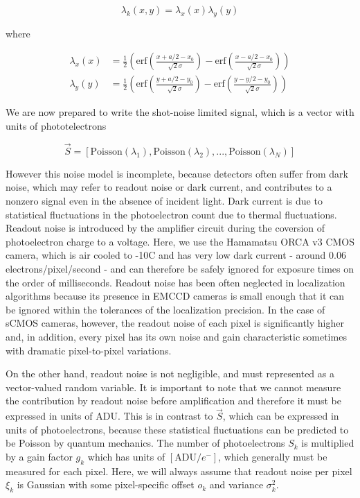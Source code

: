 \documentclass{ucetd}
\begin{document}
\begin{equation}
\lambda_{k}(x,y) = \lambda_{x}(x)\lambda_{y}(y)
\end{equation}

where

\begin{align*}
\lambda_{x}(x) &= \frac{1}{2}\left(\mathrm{erf}\left(\frac{x+a/2-x_{0}}{\sqrt{2}\sigma}\right) -\mathrm{erf}\left(\frac{x-a/2-x_{0}}{\sqrt{2}\sigma}\right)\right)\\
\lambda_{y}(y) &= \frac{1}{2}\left(\mathrm{erf}\left(\frac{y+a/2-y_{0}}{\sqrt{2}\sigma}\right) -\mathrm{erf}\left(\frac{y-y/2-y_{0}}{\sqrt{2}\sigma}\right)\right)
\end{align*}

We are now prepared to write the shot-noise limited signal, which is a vector with units of phototelectrons

\begin{equation}
\vec{S} = \left[\mathrm{Poisson}(\lambda_{1}), \mathrm{Poisson}(\lambda_{2}), ..., \mathrm{Poisson}(\lambda_{N})\right]
\end{equation}


However this noise model is incomplete, because detectors often suffer from dark noise, which may refer to readout noise or dark current, and contributes to a nonzero signal even in the absence of incident light. Dark current is due to statistical fluctuations in the photoelectron count due to thermal fluctuations. Readout noise is introduced by the amplifier circuit during the coversion of photoelectron charge to a voltage. Here, we use the Hamamatsu ORCA v3 CMOS camera, which is air cooled to -10C and has very low dark current - around 0.06 electrons/pixel/second - and can therefore be safely ignored for exposure times on the order of milliseconds. Readout noise has been often neglected in localization algorithms because its presence in EMCCD cameras is small enough that it can be ignored within the tolerances of the localization precision. In the case of sCMOS cameras, however, the readout noise of each pixel is significantly higher and, in addition, every pixel has its own noise and gain characteristic sometimes with dramatic pixel-to-pixel variations.

On the other hand, readout noise is not negligible, and must represented as a vector-valued random variable. It is important to note that we cannot measure the contribution by readout noise before amplification and therefore it must be expressed in units of $\mathrm{ADU}$. This is in contrast to $\vec{S}$, which can be expressed in units of photoelectrons, because these statistical fluctuations can be predicted to be Poisson by quantum mechanics. The number of photoelectrons $S_{k}$ is  multiplied by a gain factor $g_{k}$ which has units of $[\mathrm{ADU}/e^{-}]$, which generally must be measured for each pixel. Here, we will always assume that readout noise per pixel $\xi_{k}$ is Gaussian with some pixel-specific offset $o_{k}$ and variance $\sigma_{k}^{2}$. 
\end{document}
